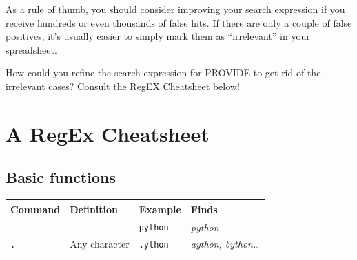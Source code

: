 \documentclass[
  11pt,
  letterpaper,
  DIV=11,
  numbers=noendperiod]{scrreprt}
\newenvironment{Shaded}{\begin{snugshade}}{\end{snugshade}}
\newcommand{\AttributeTok}[1]{\textcolor[rgb]{0.40,0.45,0.13}{#1}}
\newcommand{\CommentTok}[1]{\textcolor[rgb]{0.37,0.37,0.37}{#1}}
\newcommand{\DecValTok}[1]{\textcolor[rgb]{0.68,0.00,0.00}{#1}}
\newcommand{\FunctionTok}[1]{\textcolor[rgb]{0.28,0.35,0.67}{#1}}
\newcommand{\NormalTok}[1]{\textcolor[rgb]{0.00,0.23,0.31}{#1}}
\newcommand{\OtherTok}[1]{\textcolor[rgb]{0.00,0.23,0.31}{#1}}
\newcommand{\SpecialCharTok}[1]{\textcolor[rgb]{0.37,0.37,0.37}{#1}}
\newcommand{\StringTok}[1]{\textcolor[rgb]{0.13,0.47,0.30}{#1}}
\begin{document}
As a rule of thumb, you should consider improving your search expression
if you receive hundreds or even thousands of false hits. If there are
only a couple of false positives, it's usually easier to simply mark
them as ``irrelevant'' in your spreadsheet.

\begin{tcolorbox}[enhanced jigsaw, toprule=.15mm, opacitybacktitle=0.6, coltitle=black, arc=.35mm, colback=white, title=\textcolor{quarto-callout-caution-color}{\faFire}\hspace{0.5em}{Task}, titlerule=0mm, toptitle=1mm, bottomtitle=1mm, breakable, rightrule=.15mm, opacityback=0, bottomrule=.15mm, leftrule=.75mm, colframe=quarto-callout-caution-color-frame, left=2mm, colbacktitle=quarto-callout-caution-color!10!white]

How could you refine the search expression for PROVIDE to get rid of the
irrelevant cases? Consult the RegEX Cheatsheet below!

\begin{Shaded}
\end{Shaded}

\end{tcolorbox}

\section{A RegEx Cheatsheet}\label{a-regex-cheatsheet}

\subsection{Basic functions}\label{basic-functions}

\begin{longtable}[]{@{}llll@{}}
\toprule\noalign{}
\textbf{Command} & \textbf{Definition} & \textbf{Example} &
\textbf{Finds} \\
\midrule\noalign{}
\endhead
\bottomrule\noalign{}
\endlastfoot
& & \texttt{python} & \emph{python} \\
\texttt{.} & Any character & \texttt{.ython} & \emph{aython,
bython\ldots{}} \\
\end{longtable}
\end{document}
